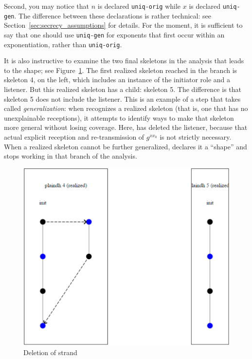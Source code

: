  Second, you may notice that $n$ is declared
\texttt{uniq-orig} while $x$ is declared \texttt{uniq-gen}.  The
difference between these declarations is rather technical: see
Section~\ref{sec:secrecy_assumptions} for details.  For the moment, it
is sufficient to say that one should use \texttt{uniq-gen} for
exponents that first occur within an exponentiation, rather than
\texttt{uniq-orig}.

\label{anchor:generalization}
  It is also instructive to
examine the two final skeletons in the analysis that leads to the
shape; see Figure~\ref{fig:plaindh_skel4_5}.  The first realized
skeleton reached in the branch is skeleton 4, on the left, which
includes an instance of the initiator role and a listener.  But this
realized skeleton has a child: skeleton 5.  The difference is that
skeleton 5 does not include the listener.  This is an example of a
step that {\cpsa} takes called \emph{generalization}: when {\cpsa}
recognizes a realized skeleton (that is, one that has no unexplainable
receptions), it attempts to identify ways to make that skeleton more
general without losing coverage.  Here, {\cpsa} has deleted the
listener, because that actual explicit reception and re-transmission
of $g^{x x_0}$ is not strictly necessary.  When a realized skeleton
cannot be further generalized, {\cpsa} declares it a ``shape'' and
stops working in that branch of the analysis.

\begin{figure}
\centering
\includegraphics[scale=0.8]{plaindh_skel4_5}
\caption{Deletion of strand}
\label{fig:plaindh_skel4_5}
\end{figure}

